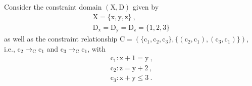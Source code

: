 \documentclass[english]{notes}
\begin{document}
\begin{example}
Consider the constraint domain $(\mathrm{X}, \mathrm{D})$ given by
%
\begin{gather*}
  \mathrm{X} = \{ \mathrm{x}, \mathrm{y}, \mathrm{z} \}
\ \text{,}\\
  \mathrm{D}_{\mathrm{x}} = \mathrm{D}_{\mathrm{y}} = \mathrm{D}_{\mathrm{z}} = \{ 1, 2, 3 \}
\end{gather*}
%
as well as the constraint relationship $\mathrm{C} = (\{ \mathrm{c}_1,
\mathrm{c}_2, \mathrm{c}_3 \}, \{ (\mathrm{c}_2, \mathrm{c}_1),
(\mathrm{c}_3, \mathrm{c}_1) \})$, i.e., $\mathrm{c}_2
\rightarrow_{\mathrm{C}} \mathrm{c}_1$ and $\mathrm{c}_3
\rightarrow_{\mathrm{C}} \mathrm{c}_1$, with
%
\begin{gather*}
  \mathrm{c}_1 : \mathrm{x} + 1 = \mathrm{y}
\ \text{,}\\
  \mathrm{c}_2 : \mathrm{z} = \mathrm{y} + 2
\ \text{,}\\
  \mathrm{c}_3 : \mathrm{x} + \mathrm{y} \leq 3
\ \text{.}
\end{gather*}


\end{example}
\end{document}
